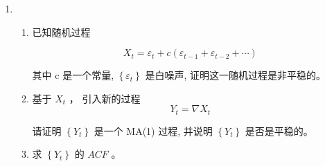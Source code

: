 \documentclass[a4paper,UTF8]{article}
\numberwithin{equation}{section}
\begin{document}
\begin{enumerate}
\item 	\begin{enumerate}[1)]
		\item 已知随机过程

		$$
		X_{t}=\varepsilon_{t}+c\left(\varepsilon_{t-1}+\varepsilon_{t-2}+\cdots\right)
		$$

		其中 $\mathrm{c}$ 是一个常量, $\left\{\varepsilon_{t}\right\}$ 是白噪声, 证明这一随机过程是非平稳的。
		\item 基于 $X_{t}$ ， 引入新的过程
		$$
		Y_{t}=\nabla X_{t}
		$$

		请证明 $\left\{Y_{t}\right\}$ 是一个 MA(1) 过程, 并说明 $\left\{Y_{t}\right\}$ 是否是平稳的。
		\item 求 $\left\{Y_{t}\right\}$ 的 $A C F$ 。
	\end{enumerate}



\end{enumerate}
\end{document}
